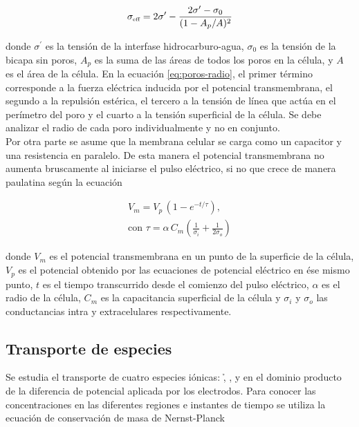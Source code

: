 \begin{equation}
	\sigma_{\textrm{\tiny eff}} = 2 \sigma^\prime - \frac{2 \sigma^\prime - \sigma_0}{(1 - A_p / A)^2}
\end{equation}

donde $\sigma^\prime$ es la tensión de la interfase hidrocarburo-agua, $\sigma_0$ es la tensión de la bicapa sin poros, $A_p$ es la suma de las áreas de todos los poros en la célula, y $A$ es el área de la célula. En la ecuación \ref{eq:poros-radio}, el primer término corresponde a la fuerza eléctrica inducida por el potencial transmembrana, el segundo a la repulsión estérica, el tercero a la tensión de línea que actúa en el perímetro del poro y el cuarto a la tensión superficial de la célula. Se debe analizar el radio de cada poro individualmente y no en conjunto.\\

Por otra parte se asume que la membrana celular se carga como un capacitor y una resistencia en paralelo. De esta manera el potencial transmembrana no aumenta bruscamente al iniciarse el pulso eléctrico, si no que crece de manera paulatina según la ecuación \cite{c7-krass07}

\begin{equation} \label{eq:capacit} \begin{split}
	V_m = V_p\, (1 - e^{-t/\tau}) , \\ \textrm{con } \tau = \alpha\, C_m \left( \frac{1}{\sigma_i} + \frac{1}{2 \sigma_o} \right)
\end{split} \end{equation}

donde $V_m$ es el potencial transmembrana en un punto de la superficie de la célula, $V_p$ es el potencial obtenido por las ecuaciones de potencial eléctrico en ése mismo punto, $t$ es el tiempo transcurrido desde el comienzo del pulso eléctrico, $\alpha$ es el radio de la célula, $C_m$ es la capacitancia superficial de la célula y $\sigma_i$ y $\sigma_o$ las conductancias intra y extracelulares respectivamente.

\subsection*{Transporte de especies}
Se estudia el transporte de cuatro especies iónicas: \h, \oh, \na y \cl en el dominio producto de la diferencia de potencial aplicada por los electrodos. Para conocer las concentraciones en las diferentes regiones e instantes de tiempo se utiliza la ecuación de conservación de masa de Nernst-Planck \cite{c6-fodava}

